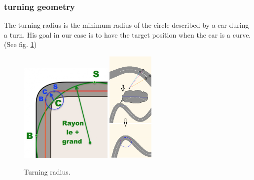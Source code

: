 \documentclass{llncs}
\begin{document}
\subsubsection{turning geometry}
The turning radius is the minimum radius of the circle described by a car during a turn. His goal in our case is to have the target position when the car is a curve. (See fig. \ref {fig09})
\begin{figure}[h!]
	
	\centering
	\includegraphics[width=0.4\textwidth]{fig/rayon.PNG}
	\includegraphics[width=0.2\textwidth]{fig/06.PNG}
	
	
	
	\begin{minipage}{10cm}
		\centering
		\caption{\footnotesize Turning radius.}
		\label{fig09}
	\end{minipage} 
\end{figure}
\end{document}

